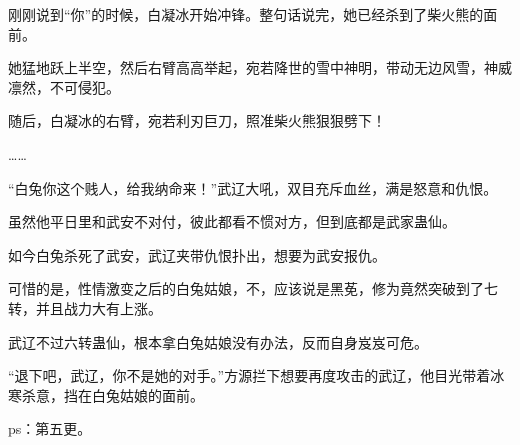 \begin{this_body}
刚刚说到“你”的时候，白凝冰开始冲锋。整句话说完，她已经杀到了柴火熊的面前。

她猛地跃上半空，然后右臂高高举起，宛若降世的雪中神明，带动无边风雪，神威凛然，不可侵犯。

随后，白凝冰的右臂，宛若利刃巨刀，照准柴火熊狠狠劈下！

……

“白兔你这个贱人，给我纳命来！”武辽大吼，双目充斥血丝，满是怒意和仇恨。

虽然他平日里和武安不对付，彼此都看不惯对方，但到底都是武家蛊仙。

如今白兔杀死了武安，武辽夹带仇恨扑出，想要为武安报仇。

可惜的是，性情激变之后的白兔姑娘，不，应该说是黑莬，修为竟然突破到了七转，并且战力大有上涨。

武辽不过六转蛊仙，根本拿白兔姑娘没有办法，反而自身岌岌可危。

“退下吧，武辽，你不是她的对手。”方源拦下想要再度攻击的武辽，他目光带着冰寒杀意，挡在白兔姑娘的面前。

ps：第五更。

\end{this_body}

